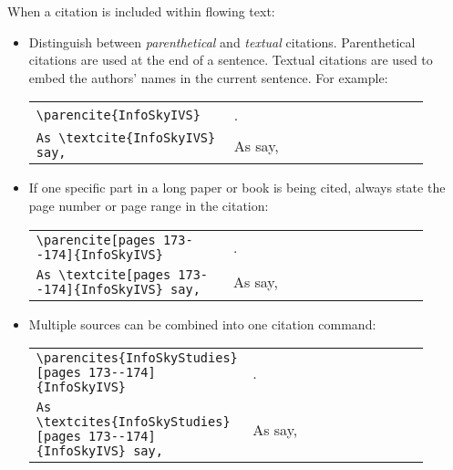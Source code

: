 When a citation is included within flowing text:
\begin{itemize}
\item Distinguish between \emph{parenthetical} and \emph{textual}
  citations. Parenthetical citations are used at the end of a
  sentence. Textual citations are used to embed the authors' names in
  the current sentence. For example:

\begin{small}
\hspace{2\parindent}
\renewcommand{\arraystretch}{1.5}
\begin{tabular}{p{0.45\linewidth}p{0.45\linewidth}}
\lstinline|\parencite{InfoSkyIVS}|        & \parencite{InfoSkyIVS}. \\
\lstinline|As \textcite{InfoSkyIVS} say,| & As \textcite{InfoSkyIVS} say,
\end{tabular}
\end{small}



\item If one specific part in a long paper or book is being cited,
  always state the page number or page range in the citation:

\begin{small}
\hspace{2\parindent}
\renewcommand{\arraystretch}{1.5}
\begin{tabular}{p{0.45\linewidth}p{0.45\linewidth}}
\lstinline|\parencite[pages 173--174]{InfoSkyIVS}|        &
  \parencite[pages 173--174]{InfoSkyIVS}. \\
\lstinline|As \textcite[pages 173--174]{InfoSkyIVS} say,| &
  As \textcite[pages 173--174]{InfoSkyIVS} say,
\end{tabular}
\end{small}



\item Multiple sources can be combined into one citation
command:

\begin{small}
\hspace{2\parindent}
\renewcommand{\arraystretch}{1.5}
\begin{tabular}{p{0.45\linewidth}p{0.45\linewidth}}
\lstinline|\parencites{InfoSkyStudies}[pages 173--174]{InfoSkyIVS}| &
  \parencites{InfoSkyStudies}[pages 173--174]{InfoSkyIVS}. \\
\lstinline|As \textcites{InfoSkyStudies}[pages 173--174]{InfoSkyIVS} say,| &
  As \textcites{InfoSkyStudies}[pages 173--174]{InfoSkyIVS} say,
\end{tabular}
\end{small}


\end{itemize}


